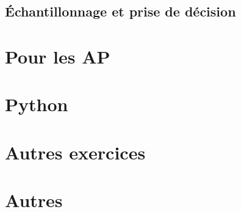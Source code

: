 \documentclass[a4paper,12pt]{book}
\begin{document}
\chapter{Échantillonnage et prise de décision}


\part{Pour les AP}


\part{Python}



\part{Autres exercices}



%

\part{Autres}







\printindex
\end{document}
